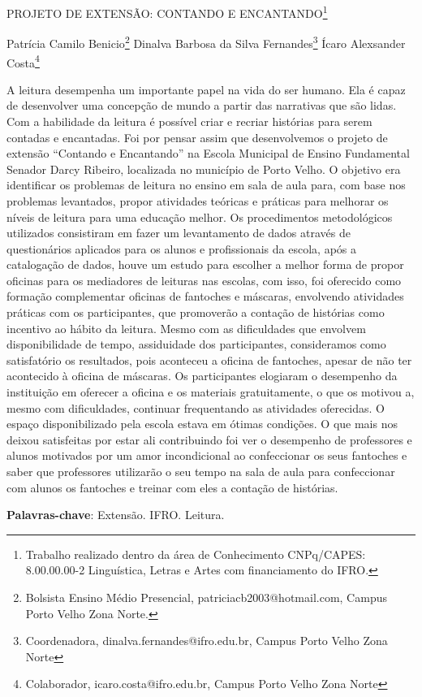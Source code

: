 \documentclass[article,12pt,onesidea,4paper,english,brazil]{abntex2}
\begin{document}
	
	
	\frenchspacing 
	
	\begin{center}
		\LARGE PROJETO DE EXTENSÃO: CONTANDO E ENCANTANDO\footnote{Trabalho realizado dentro da área de Conhecimento CNPq/CAPES: 8.00.00.00-2 Linguística, Letras e Artes com financiamento do IFRO.}
		
		\normalsize
		Patrícia Camilo Benicio\footnote{Bolsista Ensino Médio Presencial, patriciacb2003@hotmail.com, Campus Porto Velho Zona Norte.} 
		Dinalva Barbosa da Silva Fernandes\footnote{Coordenadora, dinalva.fernandes@ifro.edu.br, Campus Porto Velho Zona Norte} 
		Ícaro Alexsander Costa\footnote{Colaborador,  icaro.costa@ifro.edu.br, Campus Porto Velho Zona Norte}
	\end{center}
	
	\noindent A leitura desempenha um importante papel na vida do ser humano. Ela é capaz de desenvolver uma concepção de mundo a partir das narrativas que são lidas. Com a habilidade da leitura é possível criar e recriar histórias para serem contadas e encantadas. Foi por pensar assim que desenvolvemos o projeto de extensão “Contando e Encantando” na Escola Municipal de Ensino Fundamental Senador Darcy Ribeiro, localizada no município de Porto Velho. O objetivo era identificar os problemas de leitura no ensino em sala de aula para, com base nos problemas levantados, propor atividades teóricas e práticas para melhorar os níveis de leitura para uma educação melhor. Os procedimentos metodológicos utilizados consistiram em fazer um levantamento de dados através de questionários aplicados para os alunos e profissionais da escola, após a catalogação de dados, houve um estudo para escolher a melhor forma de propor oficinas para os mediadores de leituras nas escolas, com isso, foi oferecido como formação complementar oficinas de fantoches e máscaras, envolvendo atividades práticas com os participantes, que promoverão a contação de histórias como incentivo ao hábito da leitura. Mesmo com as dificuldades que envolvem disponibilidade de tempo, assiduidade dos participantes, consideramos como satisfatório os resultados, pois aconteceu a oficina de fantoches, apesar de não ter acontecido à oficina de máscaras. Os participantes elogiaram o desempenho da instituição em oferecer a oficina e os materiais gratuitamente, o que os motivou a, mesmo com dificuldades, continuar frequentando as atividades oferecidas. O espaço disponibilizado pela escola estava em ótimas condições. O que mais nos deixou satisfeitas por estar ali contribuindo foi ver o desempenho de professores e alunos motivados por um amor incondicional ao confeccionar os seus fantoches e saber que professores utilizarão o seu tempo na sala de aula para confeccionar com alunos os fantoches e treinar com eles a contação de histórias.
	
	\vspace{\onelineskip}
	
	\noindent
	\textbf{Palavras-chave}: Extensão. IFRO. Leitura.
	
\end{document}
